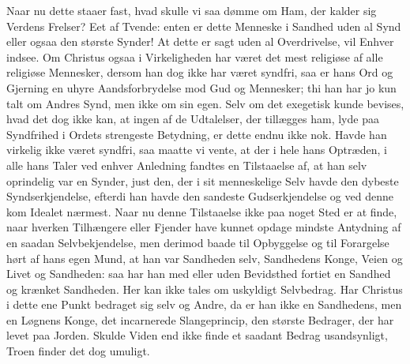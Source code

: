\documentclass[12pt]{book}
\begin{document}
Naar nu dette staaer fast, hvad skulle vi saa dømme om Ham, der
kalder sig Verdens Frelser? Eet af Tvende: enten er dette Menneske i
Sandhed uden al Synd eller ogsaa den største Synder! At dette er
sagt uden al Overdrivelse, vil Enhver indsee. Om Christus ogsaa i
Virkeligheden har været det mest religiøse af alle religiøse
Mennesker, dersom han dog ikke har været syndfri, saa er hans Ord og
Gjerning en uhyre Aandsforbrydelse mod Gud og Mennesker; thi han har
jo kun talt om Andres Synd, men ikke om sin egen. Selv om det
exegetisk kunde bevises, hvad det dog ikke kan, at ingen af de
Udtalelser, der tillægges ham, lyde paa Syndfrihed i Ordets
strengeste Betydning, er dette endnu ikke nok. Havde han virkelig
ikke været syndfri, saa maatte vi vente,
at der i hele hans Optræden, i alle hans Taler ved enhver Anledning
fandtes en Tilstaaelse af, at han selv oprindelig var en Synder,
just den, der i sit menneskelige Selv havde den dybeste
Syndserkjendelse, efterdi han havde den sandeste Gudserkjendelse og
ved denne kom Idealet nærmest. Naar nu denne Tilstaaelse ikke paa
noget Sted er at finde, naar hverken Tilhængere eller Fjender have
kunnet opdage mindste Antydning af en saadan Selvbekjendelse, men
derimod baade til Opbyggelse og til Forargelse hørt af hans egen
Mund, at han var Sandheden selv, Sandhedens Konge, Veien og Livet og
Sandheden: saa har han med eller uden Bevidsthed fortiet en Sandhed
og krænket Sandheden. Her kan ikke tales om uskyldigt Selvbedrag.
Har Christus i dette ene Punkt bedraget sig selv og Andre, da er han
ikke en Sandhedens, men en Løgnens Konge, det incarnerede
Slangeprincip, den største Bedrager, der har levet paa Jorden.
Skulde Viden end ikke finde et saadant Bedrag usandsynligt, Troen
finder det dog umuligt.
\end{document}
